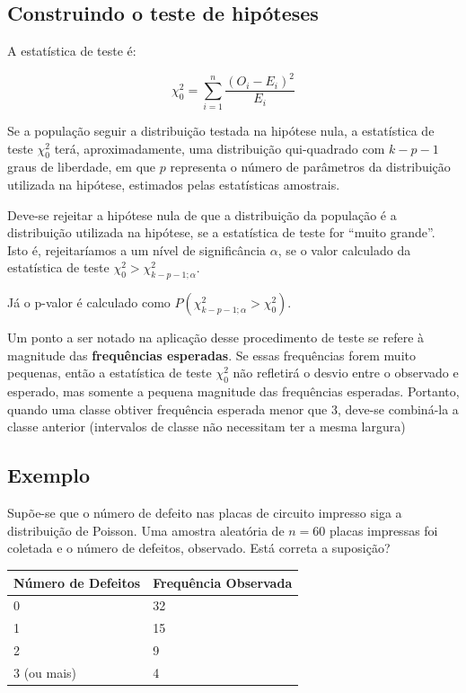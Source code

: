 \documentclass[
]{book}
\begin{document}
\hypertarget{construindo-o-teste-de-hipuxf3teses-4}{%
\subsection{Construindo o teste de hipóteses}\label{construindo-o-teste-de-hipuxf3teses-4}}

A estatística de teste é:

\[\chi^2_0=\sum_{i=1}^n\frac{(O_i-E_i)^2}{E_i}\]

Se a população seguir a distribuição testada na hipótese nula, a estatística de teste \(\chi^2_0\) terá, aproximadamente, uma distribuição qui-quadrado com \(k-p-1\) graus de liberdade, em que \(p\) representa o número de parâmetros da distribuição utilizada na hipótese, estimados pelas estatísticas amostrais.

Deve-se rejeitar a hipótese nula de que a distribuição da população é a distribuição utilizada na hipótese, se a estatística de teste for ``muito grande''. Isto é, rejeitaríamos a um nível de significância \(\alpha\), se o valor calculado da estatística de teste \(\chi^2_0>\chi^2_{k-p-1;\alpha}\).

Já o p-valor é calculado como \(P(\chi^2_{k-p-1;\alpha}>\chi^2_0)\).

Um ponto a ser notado na aplicação desse procedimento de teste se refere à magnitude das \textbf{frequências esperadas}. Se essas frequências forem muito pequenas, então a estatística de teste \(\chi^2_0\) não refletirá o desvio entre o observado e esperado, mas somente a pequena magnitude das frequências esperadas. Portanto, quando uma classe obtiver frequência esperada menor que 3, deve-se combiná-la a classe anterior (intervalos de classe não necessitam ter a mesma largura)

\hypertarget{exemplo-7}{%
\subsection{Exemplo}\label{exemplo-7}}

Supõe-se que o número de defeito nas placas de circuito impresso siga a distribuição de Poisson. Uma amostra aleatória de \(n=60\) placas impressas foi coletada e o número de defeitos, observado. Está correta a suposição?

\begin{longtable}[]{@{}ll@{}}
\toprule
Número de Defeitos & Frequência Observada \\
\midrule
\endhead
0 & 32 \\
1 & 15 \\
2 & 9 \\
3 (ou mais) & 4 \\
\bottomrule
\end{longtable}
\end{document}
